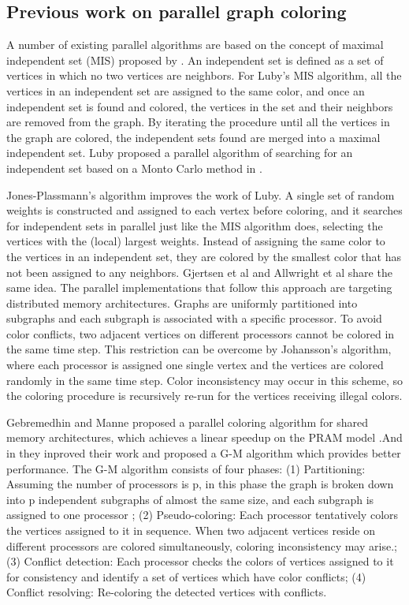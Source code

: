 \documentclass[preprint]{sigplanconf}
\begin{document}
\subsection{Previous work on parallel graph coloring}

A number of existing parallel algorithms are based on the concept of maximal independent set (MIS) proposed by \citet{luby1985simple}. An independent set is defined as a set of vertices in which no two vertices are neighbors. For Luby’s MIS algorithm, all the vertices in an independent set are assigned to the same color, and once an independent set is found and colored, the vertices in the set and their neighbors are removed from the graph. By iterating the procedure until all the vertices in the graph are colored, the independent sets found are merged into a maximal independent set. Luby proposed a parallel algorithm of searching for an independent set based on a Monto Carlo method in \cite{luby1985simple}.

Jones-Plassmann’s algorithm \cite{jones1993parallel}  improves the work of Luby. A single set of random weights is constructed and assigned to each vertex before coloring, and it searches for independent sets in parallel just like the MIS algorithm does, selecting the vertices with the (local) largest weights. Instead of assigning the same color to the vertices in an independent set, they are colored by the smallest color that has not been assigned to any neighbors. Gjertsen et al \cite{gjertsen1996parallel} and Allwright et al \cite{allwright1995comparison} share the same idea.  The parallel implementations that follow this approach are targeting distributed memory architectures.  Graphs are uniformly partitioned into subgraphs and each subgraph is associated with a specific processor.  To avoid color conflicts, two adjacent vertices on different processors cannot be colored in the same time step. This restriction can be overcome by Johansson’s algorithm, where each processor is assigned one single vertex and the vertices are colored randomly in the same time step. Color inconsistency may occur in this  scheme, so the coloring procedure is recursively re-run for the vertices receiving illegal colors.

Gebremedhin and Manne proposed a  parallel coloring algorithm for shared memory architectures, which achieves a linear speedup on the PRAM model \cite{gebremedhin2000scalable} .And in \cite{gebremedhin2006speeding} they inproved their work and proposed a G-M algorithm which provides better performance. The G-M algorithm consists of four phases: (1) Partitioning: Assuming the number of processors is p, in this phase the graph is broken down into p independent subgraphs of almost the same size, and each subgraph is assigned to one processor ; (2) Pseudo-coloring: Each processor tentatively colors the vertices assigned to it in sequence. When two adjacent vertices reside on different processors are colored simultaneously, coloring inconsistency may arise.; (3) Conflict detection:  Each processor checks the colors of  vertices assigned to it for consistency and identify a set of vertices which have color conflicts; (4) Conflict resolving: Re-coloring the detected vertices with conflicts.
\end{document}
